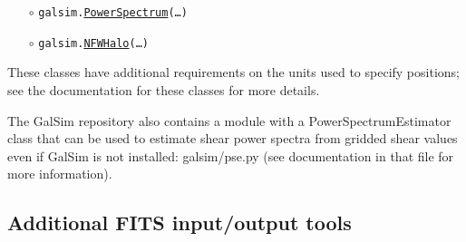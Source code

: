 \documentclass[preprint,11pt]{../../devel/modules/aastex}
\begin{document}
\begin{itemize}
\item[$\circ$]
  \texttt{galsim.}\href{http://galsim-developers.github.com/GalSim/classgalsim_1_1lensing_1_1_power_spectrum.html}{\texttt{PowerSpectrum}}\texttt{(\dots)}

\item[$\circ$]
  \texttt{galsim.}\href{http://galsim-developers.github.com/GalSim/classgalsim_1_1lensing_1_1_n_f_w_halo.html}{\texttt{NFWHalo}}\texttt{(\dots)}
\end{itemize}

These classes have additional requirements on the units used to specify
positions; see the documentation for these classes for more details.

The GalSim repository also contains a module with a
PowerSpectrumEstimator class that can be used to estimate shear power
spectra from gridded shear values even if GalSim is not installed:
galsim/pse.py (see documentation in that file for more information).

\subsection{Additional FITS input/output tools}\label{sect:multifits}
\end{document}
